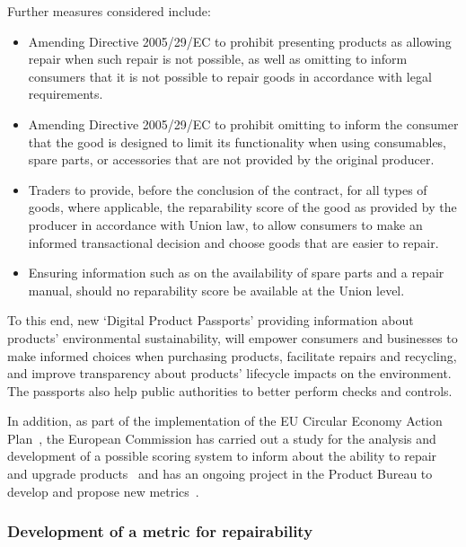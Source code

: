 Further measures considered include:

\begin{itemize}
    \item Amending Directive 2005/29/EC to prohibit presenting products as allowing
          repair when such repair is not possible, as well as omitting to inform
          consumers that it is not possible to repair goods in accordance with legal
          requirements.
    \item Amending Directive 2005/29/EC to prohibit omitting to inform the consumer that
          the good is designed to limit its functionality when using consumables, spare
          parts, or accessories that are not provided by the original producer.
    \item Traders to provide, before the conclusion of the contract, for all types of
          goods, where applicable, the reparability score of the good as provided by the
          producer in accordance with Union law, to allow consumers to make an informed
          transactional decision and choose goods that are easier to repair.
    \item Ensuring information such as on the availability of spare parts and a repair
          manual, should no reparability score be available at the Union level.
\end{itemize}

To this end, new ‘Digital Product Passports’ providing information about
products’ environmental sustainability, will empower consumers and businesses
to make informed choices when purchasing products, facilitate repairs and
recycling, and improve transparency about products’ lifecycle impacts on the
environment. The passports also help public authorities to better perform
checks and controls.

In addition, as part of the implementation of the EU Circular Economy Action
Plan~\cite{eu2020circ}, the European Commission has carried out a study for the
analysis and development of a possible scoring system to inform about the
ability to repair and upgrade products~\cite{eu2019repair} and has an ongoing
project in the Product Bureau to develop and propose new
metrics~\cite{eu2023repairproject, eu2022repair}.

\subsubsection{Development of a metric for repairability}~\cite{eu2019repair, moeslinger2022repair, ruizpastor2023repair, eu2023repair, barros2023repair,eu2022repair, eu2023repairproject,sagar2022repair}

